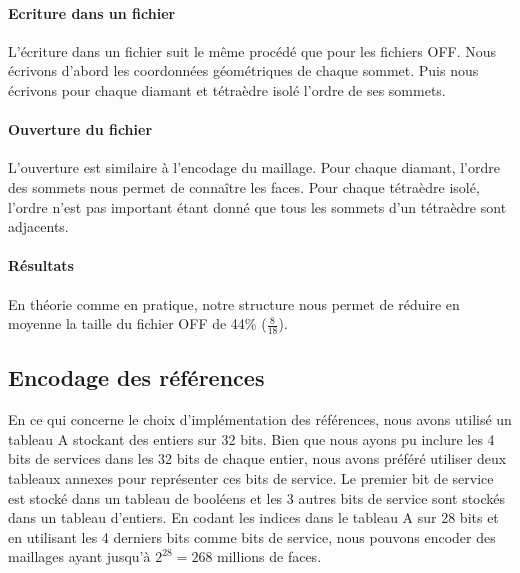 \paragraph{Ecriture dans un fichier}
L'écriture dans un fichier suit le même procédé que pour les fichiers OFF. Nous écrivons d'abord les coordonnées géométriques de chaque sommet. Puis nous écrivons pour chaque diamant et tétraèdre isolé l'ordre de ses sommets.

\paragraph{Ouverture du fichier}
L'ouverture est similaire à l'encodage du maillage. Pour chaque diamant, l'ordre des sommets nous permet de connaître les faces. Pour chaque tétraèdre isolé, l'ordre n'est pas important étant donné que tous les sommets d'un tétraèdre sont adjacents.

\paragraph{Résultats}
En théorie comme en pratique, notre structure nous permet de réduire en moyenne la taille du fichier OFF de 44\% ($\frac{8}{18}$).

\subsection{Encodage des références}
\noindent
En ce qui concerne le choix d'implémentation des références, nous avons utilisé un tableau A stockant des entiers sur 32 bits. Bien que nous ayons pu inclure les 4 bits de services dans les 32 bits de chaque entier, nous avons préféré utiliser deux tableaux annexes pour représenter ces bits de service. Le premier bit de service est stocké dans un tableau de booléens et les 3 autres bits de service sont stockés dans un tableau d'entiers. En codant les indices dans le tableau A sur 28 bits et en utilisant les 4 derniers bits comme bits de service, nous pouvons encoder des maillages ayant jusqu'à $2^{28}=268$ millions de faces.
